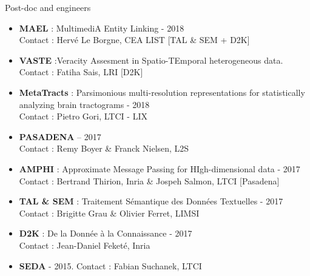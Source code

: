\begin{frame}{Post-doc and engineers}

\small
\begin{itemize}
\item 
\textbf{MAEL} : MultimediA Entity Linking - 2018
\\
Contact : Herv\'e Le Borgne, CEA LIST  {\color{red} [TAL \& SEM + D2K]}
\item
\textbf{VASTE} :Veracity Assesment in Spatio-TEmporal heterogeneous data. 
\\
Contact : Fatiha Sais, LRI  {\color{red} [D2K]}
\item
\textbf{\color{red} MetaTracts} : Parsimonious multi-resolution representations for 
statistically analyzing brain tractograms - 2018
\\
Contact : Pietro Gori, LTCI - LIX 
\item
\textbf{\color{red} PASADENA} 
– 2017
\\
Contact : Remy Boyer \& Franck Nielsen, L2S
\item
\textbf{AMPHI} : Approximate Message Passing for HIgh-dimensional data -  2017 
\\
Contact : Bertrand Thirion, Inria \& Jospeh Salmon, LTCI {\color{red} [Pasadena]}
\item
\textbf{\color{red} TAL \& SEM} : Traitement S\'emantique des Donn\'ees Textuelles - 2017
\\
Contact : Brigitte Grau \& Olivier Ferret, LIMSI
\item
\textbf{\color{red} D2K} : De la Donn\'ee \`a la Connaissance - 2017
\\
Contact : Jean-Daniel Feket\'e, Inria
\item
\textbf{\color{red} SEDA} - 2015. Contact : Fabian Suchanek, LTCI
\end{itemize}
\end{frame}

